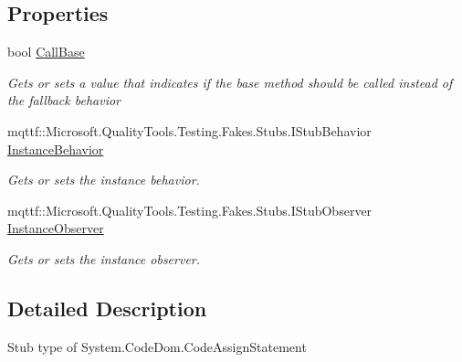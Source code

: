 \subsection*{Properties}
\begin{DoxyCompactItemize}
\item 
bool \hyperlink{class_system_1_1_code_dom_1_1_fakes_1_1_stub_code_assign_statement_a378cd90be943e67c45326008203d04df}{Call\-Base}
\begin{DoxyCompactList}\small\item\em Gets or sets a value that indicates if the base method should be called instead of the fallback behavior\end{DoxyCompactList}\item 
mqttf\-::\-Microsoft.\-Quality\-Tools.\-Testing.\-Fakes.\-Stubs.\-I\-Stub\-Behavior \hyperlink{class_system_1_1_code_dom_1_1_fakes_1_1_stub_code_assign_statement_a77f8656315b9a563004bf3c66a4e2cce}{Instance\-Behavior}
\begin{DoxyCompactList}\small\item\em Gets or sets the instance behavior.\end{DoxyCompactList}\item 
mqttf\-::\-Microsoft.\-Quality\-Tools.\-Testing.\-Fakes.\-Stubs.\-I\-Stub\-Observer \hyperlink{class_system_1_1_code_dom_1_1_fakes_1_1_stub_code_assign_statement_ab84efa9c1d36c4640d08b82662c15bd8}{Instance\-Observer}
\begin{DoxyCompactList}\small\item\em Gets or sets the instance observer.\end{DoxyCompactList}\end{DoxyCompactItemize}


\subsection{Detailed Description}
Stub type of System.\-Code\-Dom.\-Code\-Assign\-Statement



